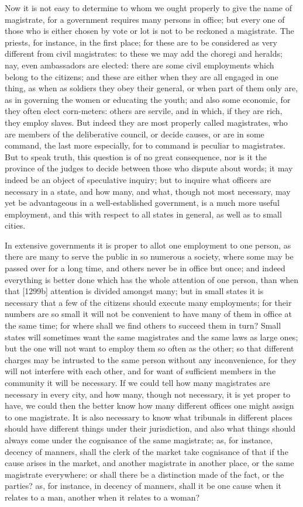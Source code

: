 Now it is not easy to determine to whom we ought properly to give the name
of magistrate, for a government requires many persons in office; but every
one of those who is either chosen by vote or lot is not to be reckoned a
magistrate. The priests, for instance, in the first place; for these are
to be considered as very different from civil magistrates: to these we may
add the choregi and heralds; nay, even ambassadors are elected: there are
some civil employments which belong to the citizens; and these are either
when they are all engaged in one thing, as when as soldiers they obey
their general, or when part of them only are, as in governing the women or
educating the youth; and also some economic, for they often elect
corn-meters: others are servile, and in which, if they are rich, they
employ slaves. But indeed they are most properly called magistrates, who
are members of the deliberative council, or decide causes, or are in some
command, the last more especially, for to command is peculiar to
magistrates. But to speak truth, this question is of no great consequence,
nor is it the province of the judges to decide between those who dispute
about words; it may indeed be an object of speculative inquiry; but to
inquire what officers are necessary in a state, and how many, and what,
though not most necessary, may yet be advantageous in a well-established
government, is a much more useful employment, and this with respect to all
states in general, as well as to small cities.

In extensive governments it is proper to allot one employment to one
person, as there are many to serve the public in so numerous a society,
where some may be passed over for a long time, and others never be in
office but once; and indeed everything is better done which has the whole
attention of one person, than when that [1299b] attention is divided
amongst many; but in small states it is necessary that a few of the
citizens should execute many employments; for their numbers are so small
it will not be convenient to have many of them in office at the same time;
for where shall we find others to succeed them in turn? Small states will
sometimes want the same magistrates and the same laws as large ones; but
the one will not want to employ them so often as the other; so that
different charges may be intrusted to the same person without any
inconvenience, for they will not interfere with each other, and for want
of sufficient members in the community it will be necessary. If we could
tell how many magistrates are necessary in every city, and how many,
though not necessary, it is yet proper to have, we could then the better
know how many different offices one might assign to one magistrate. It is
also necessary to know what tribunals in different places should have
different things under their jurisdiction, and also what things should
always come under the cognisance of the same magistrate; as, for instance,
decency of manners, shall the clerk of the market take cognisance of that
if the cause arises in the market, and another magistrate in another
place, or the same magistrate everywhere: or shall there be a distinction
made of the fact, or the parties? as, for instance, in decency of manners,
shall it be one cause when it relates to a man, another when it relates to
a woman?

